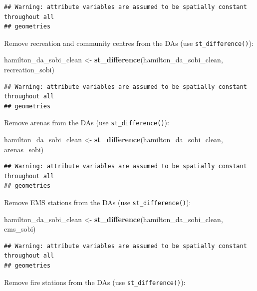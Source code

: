 \documentclass[
]{article}
\newenvironment{Shaded}{\begin{snugshade}}{\end{snugshade}}
\newcommand{\KeywordTok}[1]{\textcolor[rgb]{0.13,0.29,0.53}{\textbf{#1}}}
\newcommand{\NormalTok}[1]{#1}
\newcommand{\StringTok}[1]{\textcolor[rgb]{0.31,0.60,0.02}{#1}}
\begin{document}
\begin{verbatim}
## Warning: attribute variables are assumed to be spatially constant throughout all
## geometries
\end{verbatim}

Remove recreation and community centres from the DAs (use
\texttt{st\_difference()}):

\begin{Shaded}
\begin{Highlighting}[]
\NormalTok{hamilton_da_sobi_clean <-}\StringTok{ }\KeywordTok{st_difference}\NormalTok{(hamilton_da_sobi_clean, recreation_sobi)}
\end{Highlighting}
\end{Shaded}

\begin{verbatim}
## Warning: attribute variables are assumed to be spatially constant throughout all
## geometries
\end{verbatim}

Remove arenas from the DAs (use \texttt{st\_difference()}):

\begin{Shaded}
\begin{Highlighting}[]
\NormalTok{hamilton_da_sobi_clean <-}\StringTok{ }\KeywordTok{st_difference}\NormalTok{(hamilton_da_sobi_clean, arenas_sobi)}
\end{Highlighting}
\end{Shaded}

\begin{verbatim}
## Warning: attribute variables are assumed to be spatially constant throughout all
## geometries
\end{verbatim}

Remove EMS stations from the DAs (use \texttt{st\_difference()}):

\begin{Shaded}
\begin{Highlighting}[]
\NormalTok{hamilton_da_sobi_clean <-}\StringTok{ }\KeywordTok{st_difference}\NormalTok{(hamilton_da_sobi_clean, ems_sobi)}
\end{Highlighting}
\end{Shaded}

\begin{verbatim}
## Warning: attribute variables are assumed to be spatially constant throughout all
## geometries
\end{verbatim}

Remove fire stations from the DAs (use \texttt{st\_difference()}):
\end{document}
